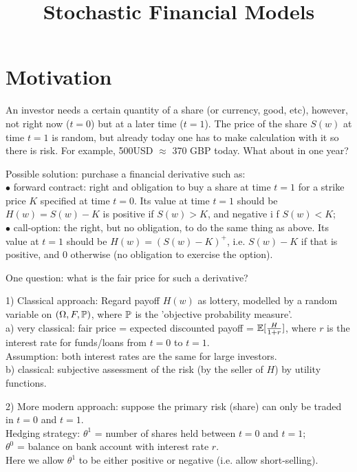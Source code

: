\documentclass[a4paper]{article}
\begin{document}
\title{Stochastic Financial Models}

\maketitle

\newpage

\tableofcontents

\newpage

\section{Motivation}
An investor needs a certain quantity of a share (or currency, good, etc), however, not right now ($t=0$) but at a later time ($t=1$). The price of the share $S(w)$ at time $t=1$ is random, but already today one has to make calculation with it so there is risk. For example, 500USD $\approx$ 370 GBP today. What about in one year?

Possible solution: purchase a financial derivative such as:\\
$\bullet$ forward contract: right and obligation to buy a share at time $t=1$ for a strike price $K$ specified at time $t=0$. Its value at time $t=1$ should be $H(w) = S(w) - K$ is positive if $S(w) > K$, and negative i	f $S(w) < K$;\\
$\bullet$ call-option: the right, but no obligation, to do the same thing as above. Its value at $t=1$ should be $H(w) = (S(w)-K)^+$, i.e. $S(w)-K$ if that is positive, and 0 otherwise (no obligation to exercise the option).

One question: what is the fair price for such a derivative?

1) Classical approach: Regard payoff $H(w)$ as lottery, modelled by a random variable on $(\Omega,F,\P)$, where $\P$ is the 'objective probability measure'.\\
a) very classical: fair price = expected discounted payoff = $\E[\frac{H}{1+r}]$, where $r$ is the interest rate for funds/loans from $t=0$ to $t=1$.\\
Assumption: both interest rates are the same for large investors.\\
b) classical: subjective assessment of the risk (by the seller of $H$) by utility functions.

2) More modern approach: suppose the primary risk (share) can only be traded in $t=0$ and $t=1$.\\
Hedging strategy: $\theta^1$ = number of shares held between $t=0$ and $t=1$;\\
$\theta^0$ = balance on bank account with interest rate $r$.\\
Here we allow $\theta^1$ to be either positive or negative (i.e. allow short-selling).
\end{document}
